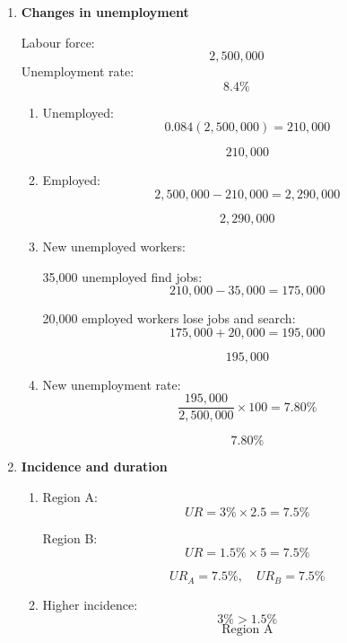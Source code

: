 \documentclass[12pt]{article}
\begin{document}
\begin{enumerate}
\begin{enumerate}[label=(\alph*)]
    \item Employment rate:
    \[
    \frac{5{,}360{,}000}{8{,}000{,}000}\times 100=67.00\%
    \]

    \[
    \boxed{67.00\%}
    \]
\end{enumerate}


\item \textbf{Changes in unemployment}

Labour force:
\[
2{,}500{,}000
\]
Unemployment rate:
\[
8.4\%
\]

\begin{enumerate}[label=(\alph*)]
    \item Unemployed:
    \[
    0.084(2{,}500{,}000)=210{,}000
    \]

    \[
    \boxed{210{,}000}
    \]

    \item Employed:
    \[
    2{,}500{,}000-210{,}000=2{,}290{,}000
    \]

    \[
    \boxed{2{,}290{,}000}
    \]

    \item New unemployed workers:

    35,000 unemployed find jobs:
    \[
    210{,}000-35{,}000=175{,}000
    \]

    20,000 employed workers lose jobs and search:
    \[
    175{,}000+20{,}000=195{,}000
    \]

    \[
    \boxed{195{,}000}
    \]

    \item New unemployment rate:
    \[
    \frac{195{,}000}{2{,}500{,}000}\times 100=7.80\%
    \]

    \[
    \boxed{7.80\%}
    \]
\end{enumerate}


\item \textbf{Incidence and duration}

\begin{enumerate}[label=(\alph*)]
    \item Region A:
    \[
    UR=3\%\times 2.5=7.5\%
    \]

    Region B:
    \[
    UR=1.5\%\times 5=7.5\%
    \]

    \[
    \boxed{UR_A=7.5\%,\quad UR_B=7.5\%}
    \]

    \item Higher incidence:
    \[
    3\%>1.5\%
    \]
    \[
    \boxed{\text{Region A}}
    \]


\end{enumerate}
\end{enumerate}
\end{document}
